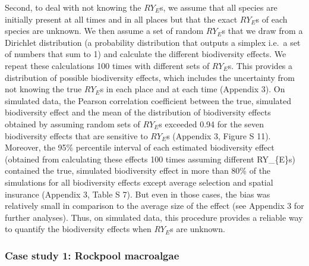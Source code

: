 \documentclass[
  letterpaper,
  DIV=11,
  numbers=noendperiod]{scrartcl}
\begin{document}
Second, to deal with not knowing the \(RY_{E}\)s, we assume that all
species are initially present at all times and in all places but that
the exact \(RY_{E}\)s of each species are unknown. We then assume a set
of random \(RY_{E}\)s that we draw from a Dirichlet distribution (a
probability distribution that outputs a simplex i.e.~a set of numbers
that sum to 1) and calculate the different biodiversity effects. We
repeat these calculations 100 times with different sets of \(RY_{E}\)s.
This provides a distribution of possible biodiversity effects, which
includes the uncertainty from not knowing the true \(RY_{E}\)s in each
place and at each time (Appendix 3). On simulated data, the Pearson
correlation coefficient between the true, simulated biodiversity effect
and the mean of the distribution of biodiversity effects obtained by
assuming random sets of \(RY_{E}\)s exceeded 0.94 for the seven
biodiversity effects that are sensitive to \(RY_{E}\)s (Appendix 3,
Figure S 11). Moreover, the 95\% percentile interval of each estimated
biodiversity effect (obtained from calculating these effects 100 times
assuming different RY\_\{E\}s) contained the true, simulated
biodiversity effect in more than 80\% of the simulations for all
biodiversity effects except average selection and spatial insurance
(Appendix 3, Table S 7). But even in those cases, the bias was
relatively small in comparison to the average size of the effect (see
Appendix 3 for further analyses). Thus, on simulated data, this
procedure provides a reliable way to quantify the biodiversity effects
when \(RY_{E}\)s are unknown.

\subsubsection{Case study 1: Rockpool
macroalgae}\label{case-study-1-rockpool-macroalgae}
\end{document}
